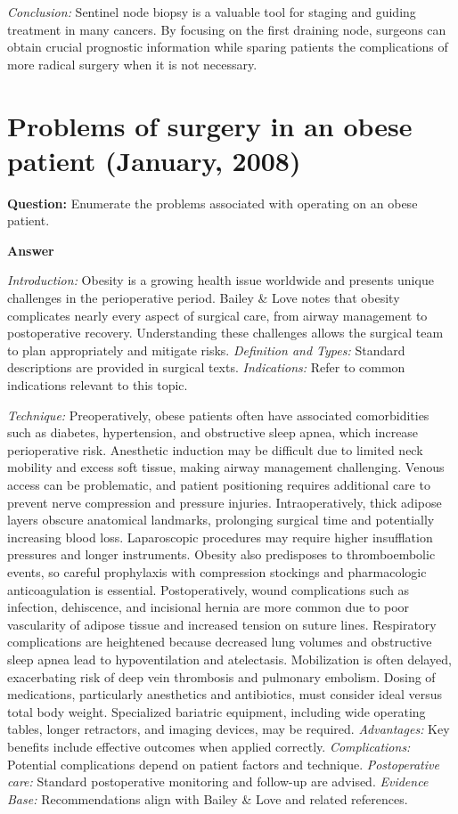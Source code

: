 \documentclass{article}
\begin{document}
\emph{Conclusion:} Sentinel node biopsy is a valuable tool for staging and guiding treatment in many cancers. By focusing on the first draining node, surgeons can obtain crucial prognostic information while sparing patients the complications of more radical surgery when it is not necessary.


\section{Problems of surgery in an obese patient (January, 2008)}

\textbf{Question:} Enumerate the problems associated with operating on an obese patient.

\textbf{Answer}

\emph{Introduction:} Obesity is a growing health issue worldwide and presents unique challenges in the perioperative period. Bailey \& Love notes that obesity complicates nearly every aspect of surgical care, from airway management to postoperative recovery. Understanding these challenges allows the surgical team to plan appropriately and mitigate risks.
\emph{Definition and Types:} Standard descriptions are provided in surgical texts.
\emph{Indications:} Refer to common indications relevant to this topic.

\emph{Technique:} Preoperatively, obese patients often have associated comorbidities such as diabetes, hypertension, and obstructive sleep apnea, which increase perioperative risk. Anesthetic induction may be difficult due to limited neck mobility and excess soft tissue, making airway management challenging. Venous access can be problematic, and patient positioning requires additional care to prevent nerve compression and pressure injuries. Intraoperatively, thick adipose layers obscure anatomical landmarks, prolonging surgical time and potentially increasing blood loss. Laparoscopic procedures may require higher insufflation pressures and longer instruments. Obesity also predisposes to thromboembolic events, so careful prophylaxis with compression stockings and pharmacologic anticoagulation is essential. Postoperatively, wound complications such as infection, dehiscence, and incisional hernia are more common due to poor vascularity of adipose tissue and increased tension on suture lines. Respiratory complications are heightened because decreased lung volumes and obstructive sleep apnea lead to hypoventilation and atelectasis. Mobilization is often delayed, exacerbating risk of deep vein thrombosis and pulmonary embolism. Dosing of medications, particularly anesthetics and antibiotics, must consider ideal versus total body weight. Specialized bariatric equipment, including wide operating tables, longer retractors, and imaging devices, may be required.
\emph{Advantages:} Key benefits include effective outcomes when applied correctly.
\emph{Complications:} Potential complications depend on patient factors and technique.
\emph{Postoperative care:} Standard postoperative monitoring and follow-up are advised.
\emph{Evidence Base:} Recommendations align with Bailey \& Love and related references.
\end{document}
